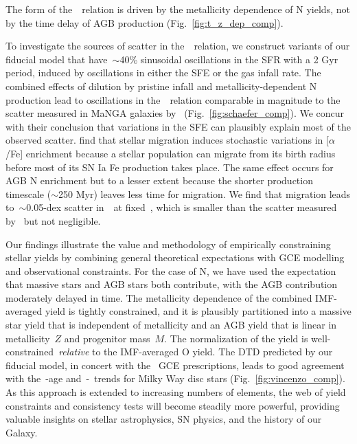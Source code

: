 \documentclass[ms.tex]{subfiles}
\begin{document}
The form of the~\ohno~relation is driven by the metallicity dependence of N
yields, not by the time delay of AGB production (Fig.~\ref{fig:t_z_dep_comp}).
\par
To investigate the sources of scatter in the~\ohno~relation, we construct
variants of our fiducial model that have~$\sim$40\% sinusoidal oscillations in
the SFR with a 2 Gyr period, induced by oscillations in either the SFE or the
gas infall rate.
The combined effects of dilution by pristine infall and metallicity-dependent N
production lead to oscillations in the~\ohno~relation comparable in magnitude
to the scatter measured in MaNGA galaxies by~\citet{Schaefer2020}
(Fig.~\ref{fig:schaefer_comp}).
We concur with their conclusion that variations in the SFE can plausibly
explain most of the observed scatter.
\citet{Johnson2021} find that stellar migration induces stochastic variations
in [$\alpha$/Fe] enrichment because a stellar population can migrate from its
birth radius before most of its SN Ia Fe production takes place.
The same effect occurs for AGB N enrichment but to a lesser extent because the
shorter production timescale ($\sim$250 Myr) leaves less time for migration.
We find that migration leads to~$\sim$0.05-dex scatter in~\no~at fixed~\oh,
which is smaller than the scatter measured by~\citet{Schaefer2020} but not
negligible.
\par
Our findings illustrate the value and methodology of empirically constraining
stellar yields by combining general theoretical expectations with GCE modelling
and observational constraints.
For the case of N, we have used the expectation that massive stars and AGB stars
both contribute, with the AGB contribution moderately delayed in time.
The metallicity dependence of the combined IMF-averaged yield is tightly
constrained, and it is plausibly partitioned into a massive star yield that is
independent of metallicity and an AGB yield that is linear in metallicity~$Z$
and progenitor mass~$M$.
The normalization of the yield is well-constrained~\textit{relative} to the
IMF-averaged O yield.
The DTD predicted by our fiducial model, in concert with the~\citet{Johnson2021}
GCE prescriptions, leads to good agreement with the~\no-age and~\no-\ofe~trends
for Milky Way disc stars (Fig.~\ref{fig:vincenzo_comp}).
As this approach is extended to increasing numbers of elements, the web of
yield constraints and consistency tests will become steadily more powerful,
providing valuable insights on stellar astrophysics, SN physics, and the
history of our Galaxy.
\end{document}
